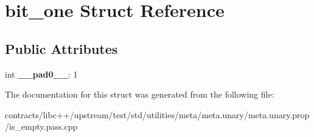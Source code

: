 \hypertarget{structbit__one}{}\section{bit\+\_\+one Struct Reference}
\label{structbit__one}
\subsection*{Public Attributes}
\begin{DoxyCompactItemize}
\item 
\mbox{\label{structbit__one_a1f928cd4632b9d6fee8174292979a1b0}} 
int {\bfseries \+\_\+\+\_\+pad0\+\_\+\+\_\+}\+: 1
\end{DoxyCompactItemize}


The documentation for this struct was generated from the following file\+:\begin{DoxyCompactItemize}
\item 
contracts/libc++/upstream/test/std/utilities/meta/meta.\+unary/meta.\+unary.\+prop/is\+\_\+empty.\+pass.\+cpp\end{DoxyCompactItemize}
